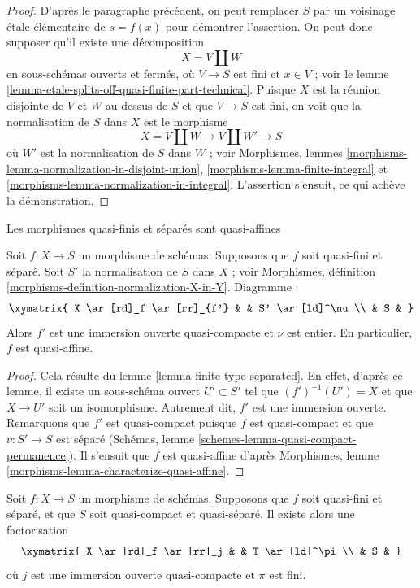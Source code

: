 \begin{proof}
\medskip\noindent
D'après le paragraphe précédent, on peut remplacer $S$ par un
voisinage \'etale élémentaire de $s = f(x)$ pour démontrer l'assertion.
On peut donc supposer qu'il existe une décomposition
$$
X = V \amalg W
$$
en sous-schémas ouverts et fermés, où $V \to S$ est fini et $x \in V$ ;
voir le lemme \ref{lemma-etale-splits-off-quasi-finite-part-technical}.
Puisque $X$ est la réunion disjointe de $V$ et $W$ au-dessus de $S$ et que
$V \to S$ est fini, on voit que la
normalisation de $S$ dans $X$ est le morphisme
$$
X = V \amalg W \longrightarrow V \amalg W' \longrightarrow S
$$
où $W'$ est la normalisation de $S$ dans $W$ ; voir
Morphismes, lemmes \ref{morphisms-lemma-normalization-in-disjoint-union},
\ref{morphisms-lemma-finite-integral} et
\ref{morphisms-lemma-normalization-in-integral}.
L'assertion s'ensuit, ce qui achève la démonstration.
\end{proof}

\begin{lemma}
\label{lemma-quasi-finite-separated-quasi-affine}
\begin{slogan}
Les morphismes quasi-finis et séparés sont quasi-affines
\end{slogan}
Soit $f : X \to S$ un morphisme de schémas.
Supposons que $f$ soit quasi-fini et séparé.
Soit $S'$ la normalisation de $S$ dans $X$ ; voir
Morphismes, définition \ref{morphisms-definition-normalization-X-in-Y}.
Diagramme :
$$
\xymatrix{
X \ar[rd]_f \ar[rr]_{f'} & & S' \ar[ld]^\nu \\
& S &
}
$$
Alors $f'$ est une immersion ouverte quasi-compacte et $\nu$ est entier.
En particulier, $f$ est quasi-affine.
\end{lemma}

\begin{proof}
Cela résulte du lemme \ref{lemma-finite-type-separated}. En effet, d'après
ce lemme, il existe un sous-schéma ouvert $U' \subset S'$ tel que
$(f')^{-1}(U') = X$ et que $X \to U'$ soit un isomorphisme. Autrement
dit, $f'$ est une immersion ouverte. Remarquons que $f'$ est quasi-compact puisque
$f$ est quasi-compact et que $\nu : S' \to S$ est séparé
(Schémas, lemme \ref{schemes-lemma-quasi-compact-permanence}).
Il s'ensuit que $f$ est quasi-affine d'après
Morphismes, lemme \ref{morphisms-lemma-characterize-quasi-affine}.
\end{proof}

\begin{lemma}
\label{lemma-quasi-finite-separated-pass-through-finite}
\begin{reference}
\cite[IV Corollaire 18.12.13]{EGA}
\end{reference}
Soit $f : X \to S$ un morphisme de schémas.
Supposons que $f$ soit quasi-fini et séparé, et que
$S$ soit quasi-compact et quasi-séparé. Il existe alors
une factorisation
$$
\xymatrix{
X \ar[rd]_f \ar[rr]_j & & T \ar[ld]^\pi \\
& S &
}
$$
où $j$ est une immersion ouverte quasi-compacte et $\pi$ est fini.
\end{lemma}

